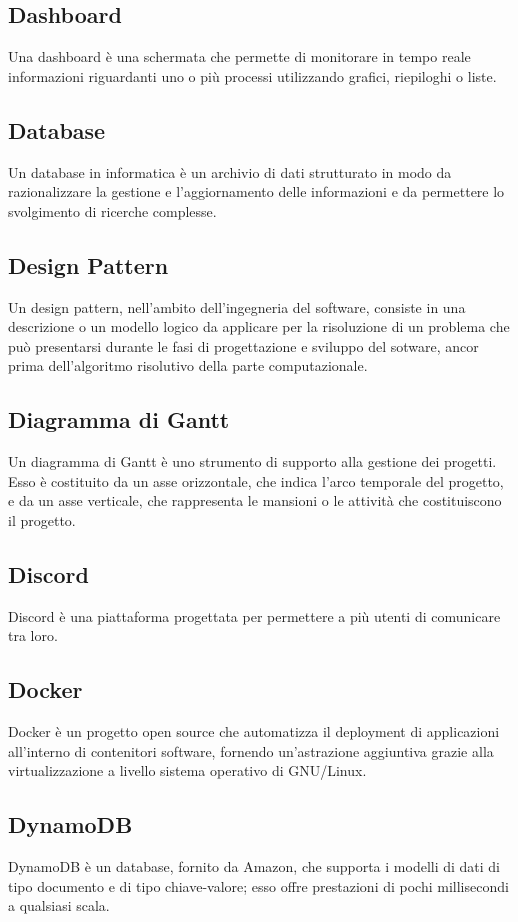 
\subsection*{Dashboard}
Una dashboard è una schermata che permette di monitorare in tempo reale informazioni riguardanti uno o più processi utilizzando grafici, riepiloghi o liste.

\subsection*{Database}
Un database in informatica è un archivio di dati strutturato in modo da razionalizzare la gestione e l'aggiornamento delle informazioni e da permettere lo svolgimento di ricerche complesse.

\subsection*{Design Pattern}
Un design pattern, nell'ambito dell'ingegneria del software, consiste in una descrizione o un modello logico da applicare per la risoluzione di un problema che può presentarsi durante le fasi di progettazione e sviluppo del sotware, ancor prima dell'algoritmo risolutivo della parte computazionale.

\subsection*{Diagramma di Gantt}
Un diagramma di Gantt è uno strumento di supporto alla gestione dei progetti. Esso è costituito da un asse orizzontale, che indica l'arco temporale del progetto, e da un asse verticale, che rappresenta le mansioni o le attività che costituiscono il progetto.

\subsection*{Discord}
Discord è una piattaforma progettata per permettere a più utenti di comunicare tra loro.

\subsection*{Docker}
Docker è un progetto open source che automatizza il deployment di applicazioni all'interno di contenitori software, fornendo un'astrazione aggiuntiva grazie alla virtualizzazione a livello sistema operativo di GNU/Linux.

\subsection*{DynamoDB}
DynamoDB è un database, fornito da Amazon, che supporta i modelli di dati di tipo documento e di tipo chiave-valore; esso offre prestazioni di pochi millisecondi a qualsiasi scala.


